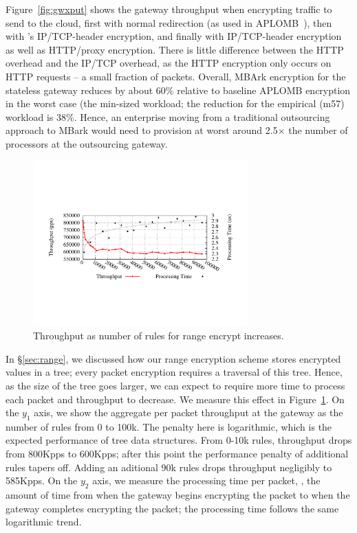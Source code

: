 Figure~\ref{fig:gwxput} shows the gateway throughput when encrypting traffic to send to the cloud, first with normal redirection (as used in APLOMB~\cite{aplomb}), then with \sys's IP/TCP-header encryption, and finally with IP/TCP-header encryption as well as HTTP/proxy encryption. There is little difference between the HTTP overhead and the IP/TCP overhead, as the HTTP encryption only occurs on HTTP requests -- a small fraction of packets. Overall, MBArk encryption for the stateless gateway reduces by about 60\% relative to baseline APLOMB encryption in the worst case (the min-sized workload; the reduction for the empirical (m57) workload is 38\%. Hence, an enterprise moving from a traditional outsourcing approach to MBark would need to provision at worst around 2.5$\times$ the number of processors at the outsourcing gateway.

\begin{figure}[t]
  \includegraphics[width=3.25in]{fig/xputrange}
  \vspace{-10pt}
  \caption[]{\label{fig:xputrange} Throughput as number of rules for range encrypt increases.}
\end{figure}

In \S\ref{sec:range}, we discussed how our range encryption scheme stores encrypted values in a tree; every packet encryption requires a traversal of this tree.
Hence, as the size of the tree goes larger, we can expect to require more time to process each packet and throughput to decrease.
We measure this effect in Figure~\ref{fig:xputrange}. 
On the $y_1$ axis, we show the aggregate per packet throughput at the gateway as the number of rules from 0 to 100k. The penalty here is logarithmic, which is the expected performance of tree data structures. From 0-10k rules, throughput drops from 800Kpps to 600Kpps; after this point the performance penalty of additional rules tapers off. Adding an aditional 90k rules drops throughput negligibly to 585Kpps.
On the $y_2$ axis, we measure the processing time per packet, \ie{}, the amount of time from when the gateway begins encrypting the packet to when the gateway completes encrypting the packet; the processing time follows the same logarithmic trend.

